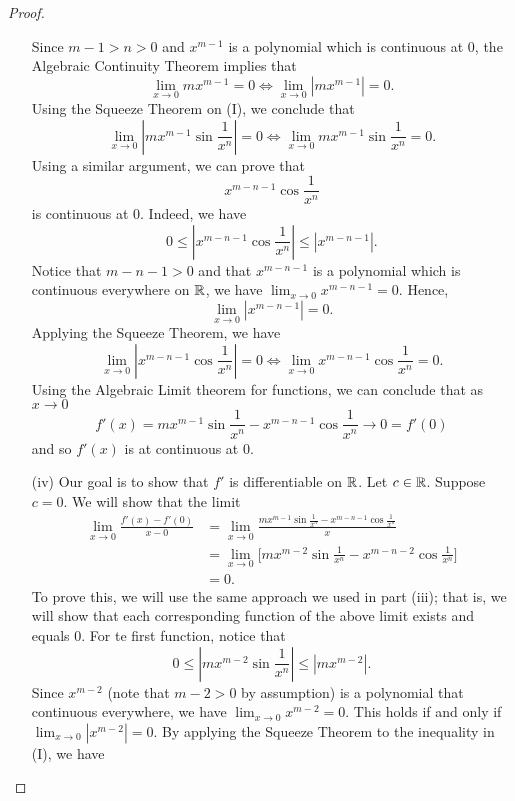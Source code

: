 \documentclass[a4paper]{article}
\begin{document}
\begin{proof}
\begin{enumerate}
        Since \( m - 1 > n > 0  \) and \( x^{m-1} \) is a polynomial which is continuous at \( 0  \), the Algebraic Continuity Theorem implies that 
        \[  \lim_{ x \to 0 }  m x^{m-1} = 0 \iff \lim_{ x \to 0 }  | m x^{m-1} |  = 0.  \]
        Using the Squeeze Theorem on (I), we conclude that 
        \[  \lim_{ x \to 0 }  | m x^{m-1} \sin \frac{ 1 }{ x^{n} }  | = 0 \iff \lim_{ x \to 0 }  m x^{m-1} \sin \frac{ 1 }{ x^{n} } = 0.  \]
        Using a similar argument, we can prove that 
        \[  x^{m-n-1} \cos \frac{ 1 }{ x^{n} } \]
        is continuous at \( 0  \).
        Indeed, we have 
        \[  0 \leq | x^{m-n-1} \cos \frac{ 1 }{ x^{n} }  | \leq | x^{m-n-1} |. \tag{\( | \cos x  | \leq 1  \ \forall x \in \R  \)}  \]
        Notice that \( m - n - 1 > 0  \) and that \( x^{m-n-1}  \) is a polynomial which is continuous everywhere on \( \mathbb{R}  \), we have \( \lim_{ x \to 0 }  x^{m-n-1}  = 0 \). Hence, 
        \[  \lim_{ x \to 0 }  | x^{m-n-1}  |  = 0.  \]
        Applying the Squeeze Theorem, we have 
        \[  \lim_{ x \to 0 } | x^{m-n-1} \cos \frac{ 1 }{ x^{n} }  | = 0 \iff \lim_{ x \to 0 } x^{m-n-1} \cos \frac{ 1 }{ x^{n} } = 0.  \]
        Using the Algebraic Limit theorem for functions, we can conclude that as \( x \to 0  \) 
        \[  f'(x) = m x^{m-1} \sin \frac{ 1 }{ x^{n} }  - x^{m-n-1} \cos \frac{ 1 }{ x^{n} } \to 0  = f'(0) \]
        and so \( f'(x) \) is at continuous at \( 0 \).
    \item[(iv)] Our goal is to show that \( f' \) is differentiable on \( \mathbb{R}  \). Let \( c \in \mathbb{R}  \). Suppose \( c = 0  \). We will show that the limit 
        \begin{align*}
            \lim_{ x \to 0 } \frac{ f'(x) - f'(0) }{  x - 0  }  &= \lim_{ x \to 0 }  \frac{ m x^{m-1} \sin \frac{ 1 }{ x^{n} }  - x^{m-n-1} \cos \frac{ 1 }{ x^{n} }  }{ x  }  \\ 
                                                                &= \lim_{ x \to 0 } \Big[ m x^{m-2} \sin \frac{ 1 }{ x^{n} }  - x^{m-n-2} \cos \frac{ 1 }{ x^{n} } \Big]     \\
                                                                &= 0.
    \end{align*}
    To prove this, we will use the same approach we used in part (iii); that is, we will show that each corresponding function of the above limit exists and equals \( 0  \). For te first function, notice that 
        \[   0 \leq | m x^{m-2} \sin \frac{ 1 }{ x^{n} }  | \leq | m x^{m-2} |. \tag{I}  \]
        Since \( x^{m-2} \) (note that \( m - 2 > 0  \) by assumption) is a polynomial that continuous everywhere, we have \( \lim_{ x \to 0 }  x^{m-2} = 0  \). This holds if and only if \( \lim_{ x \to 0 }  | x^{m-2} |  = 0  \). By applying the Squeeze Theorem to the inequality in (I), we have 

\end{enumerate}
\end{proof}
\end{document}
